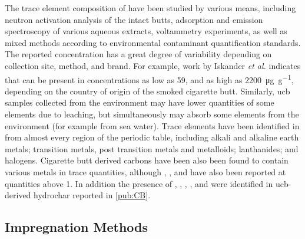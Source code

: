 The trace element composition of  have been studied by various means, including neutron activation analysis of the intact butts,\citep{iskander1992multielement, Iskander1985, jenkins1985neutron, Wu1997} \gls{adsorption} and emission spectroscopy of various aqueous extracts,\citep{MussaloRauhamaa1986, Kazi2009, Moriwaki2009, Moerman2011, Pelit2013, Dobaradaran2018} voltammetry experiments,\citep{Nitsch1991, Kalcher1993} as well as mixed methods according to environmental contaminant quantification standards.\citep{cardoso2018exposure} The reported concentration has a great degree of variability depending on collection site, method, and brand. For example, work by Iskander \textit{et al.} indicates that  can be present in concentrations as low as \num{59}, and as high as \qty{2200}{\micro\gram\per\gram}, depending on the country of origin of the smoked cigarette butt. Similarly, \acrshort{ucb} samples collected from the environment\citep{Dobaradaran2017, Moriwaki2009, Moerman2011, chevalier2018nano} may have lower quantities of some elements due to leaching, but simultaneously may absorb some elements from the environment (for example from sea water). Trace elements have been identified in  from almost every region of the periodic table, including alkali and alkaline earth metals;\cite{MussaloRauhamaa1986, Iskander1985, iskander1992multielement, jenkins1985neutron, Wu1997, cardoso2018exposure}  transition metals, post transition metals and metalloids;\citep{MussaloRauhamaa1986, Dobaradaran2017, Iskander1985, jenkins1985neutron, Wu1997, Moriwaki2009, Moerman2011, Pelit2013, Dobaradaran2018, Ren2017, cardoso2018exposure, chevalier2018nano} lanthanides;\citep{iskander1992multielement} and halogens.\citep{Iskander1985, iskander1992multielement, jenkins1985neutron, Wu1997} Cigarette butt derived carbons have been also been found to contain various metals in trace quantities,\citep{Soltani, Soltani2013, Yazdi2012} although , , and  have also been reported at quantities above \qty{1}{\wtpercent}.\citep{Soltani, Soltani2013, Yazdi2012, lima2018, Lee2014} In addition the presence of , , , , and  were identified in \acrshort{ucb}-derived \gls{hydrochar} reported in \ref{pub:CB}.

\subsection{Impregnation Methods}

